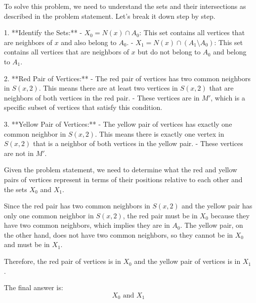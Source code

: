 To solve this problem, we need to understand the sets and their intersections as described in the problem statement. Let's break it down step by step.

1. **Identify the Sets:**
   - \( X_0 = N(x) \cap A_0 \): This set contains all vertices that are neighbors of \( x \) and also belong to \( A_0 \).
   - \( X_1 = N(x) \cap (A_1 \setminus A_0) \): This set contains all vertices that are neighbors of \( x \) but do not belong to \( A_0 \) and belong to \( A_1 \).

2. **Red Pair of Vertices:**
   - The red pair of vertices has two common neighbors in \( S(x, 2) \). This means there are at least two vertices in \( S(x, 2) \) that are neighbors of both vertices in the red pair.
   - These vertices are in \( M' \), which is a specific subset of vertices that satisfy this condition.

3. **Yellow Pair of Vertices:**
   - The yellow pair of vertices has exactly one common neighbor in \( S(x, 2) \). This means there is exactly one vertex in \( S(x, 2) \) that is a neighbor of both vertices in the yellow pair.
   - These vertices are not in \( M' \).

Given the problem statement, we need to determine what the red and yellow pairs of vertices represent in terms of their positions relative to each other and the sets \( X_0 \) and \( X_1 \).

Since the red pair has two common neighbors in \( S(x, 2) \) and the yellow pair has only one common neighbor in \( S(x, 2) \), the red pair must be in \( X_0 \) because they have two common neighbors, which implies they are in \( A_0 \). The yellow pair, on the other hand, does not have two common neighbors, so they cannot be in \( X_0 \) and must be in \( X_1 \).

Therefore, the red pair of vertices is in \( X_0 \) and the yellow pair of vertices is in \( X_1 \).

The final answer is:
\[
\boxed{X_0 \text{ and } X_1}
\]